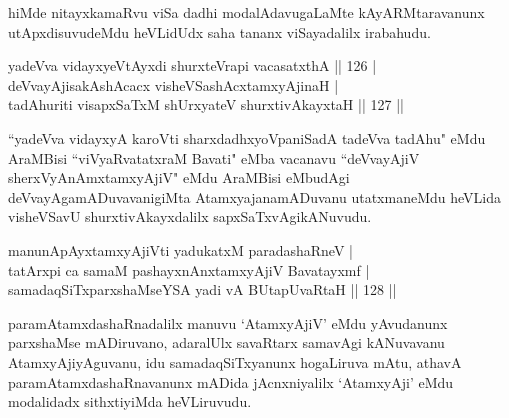 \begin{artha}
hiMde nitayxkamaRvu viSa dadhi modalAdavugaLaMte kAyARMtaravanunx utApxdisuvudeMdu heVLidUdx saha tananx viSayadalilx irabahudu.
\end{artha}

\begin{shl}
yadeVva vidayxyeVtAyxdi shurxteVrapi vacasatxthA \hfill || 126 |\\
deVvayAjisakAshAcacx visheVSashAcx\s \s tamxyAjinaH |\\
tadAhuriti visapxSaTxM shUrxyateV shurxtivAkayxtaH \hfill || 127 ||
\end{shl}

\begin{artha}
``yadeVva vidayxyA karoVti sharxdadhxyoVpaniSadA tadeVva tadAhu"  eMdu AraMBisi ``viVyaRvatatxraM Bavati" eMba vacanavu ``deVvayAjiV sherxVyAnAmxtamxyAjiV" eMdu AraMBisi eMbudAgi deVvayAgamADuvavanigiMta AtamxyajanamADuvanu utatxmaneMdu heVLida visheVSavU shurxtivAkayxdalilx sapxSaTxvAgikANuvudu.
\end{artha}

\begin{shl}
\footnotemark{}manunA\s pAyxtamxyAjiVti yadukatxM paradashaRneV |\\
tatArxpi ca samaM pashayxnAnxtamxyAjiV Bavatayxmf |\\
samadaqSiTxparxshaMseYSA yadi vA \footnotemark{}BUtapUvaRtaH \hfill || 128 ||
\end{shl}

\begin{artha}
paramAtamxdashaRnadalilx manuvu `AtamxyAjiV' eMdu yAvudanunx parxshaMse mADiruvano, adaralUlx savaRtarx samavAgi kANuvavanu AtamxyAjiyAguvanu, idu samadaqSiTxyanunx hogaLiruva mAtu, athavA paramAtamxdashaRnavanunx mADida jAcnxniyalilx `AtamxyAji' eMdu modalidadx sithxtiyiMda heVLiruvudu.
\end{artha}


